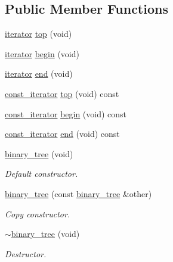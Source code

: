 \subsection*{Public Member Functions}
\begin{DoxyCompactItemize}
\item 
\hyperlink{classcrap_1_1binary__tree_af3313f011a64bb5a945dcd39cc3fc3c3}{iterator} \hyperlink{classcrap_1_1binary__tree_af1890d7683cf194199091f874489805d}{top} (void)
\item 
\hyperlink{classcrap_1_1binary__tree_af3313f011a64bb5a945dcd39cc3fc3c3}{iterator} \hyperlink{classcrap_1_1binary__tree_a3a10de9d88f7a036e7c235536fc35999}{begin} (void)
\item 
\hyperlink{classcrap_1_1binary__tree_af3313f011a64bb5a945dcd39cc3fc3c3}{iterator} \hyperlink{classcrap_1_1binary__tree_a6772ed25fccbde673feb71cb3212d743}{end} (void)
\item 
\hyperlink{classcrap_1_1binary__tree_aa9b9a8c0dd4bb6c574ea0526040e7c50}{const\-\_\-iterator} \hyperlink{classcrap_1_1binary__tree_acdc8b8ca248c19336feb927fcdd4d8b3}{top} (void) const 
\item 
\hyperlink{classcrap_1_1binary__tree_aa9b9a8c0dd4bb6c574ea0526040e7c50}{const\-\_\-iterator} \hyperlink{classcrap_1_1binary__tree_a612e86f27a3fbf67dacb741270880c8f}{begin} (void) const 
\item 
\hyperlink{classcrap_1_1binary__tree_aa9b9a8c0dd4bb6c574ea0526040e7c50}{const\-\_\-iterator} \hyperlink{classcrap_1_1binary__tree_a25e67ca97e0f3e281d54ce52dd280783}{end} (void) const 
\item 
\hyperlink{classcrap_1_1binary__tree_a5326fed3645520e2573ed3fc1bbcd7c5}{binary\-\_\-tree} (void)
\begin{DoxyCompactList}\small\item\em Default constructor. \end{DoxyCompactList}\item 
\hyperlink{classcrap_1_1binary__tree_a76f1d93694a57bda23be935f2d17f6ac}{binary\-\_\-tree} (const \hyperlink{classcrap_1_1binary__tree}{binary\-\_\-tree} \&other)
\begin{DoxyCompactList}\small\item\em Copy constructor. \end{DoxyCompactList}\item 
\hyperlink{classcrap_1_1binary__tree_ab30bf57369815810ec7f96bac498e775}{$\sim$binary\-\_\-tree} (void)
\begin{DoxyCompactList}\small\item\em Destructor. \end{DoxyCompactList}\item 

\end{DoxyCompactItemize}
